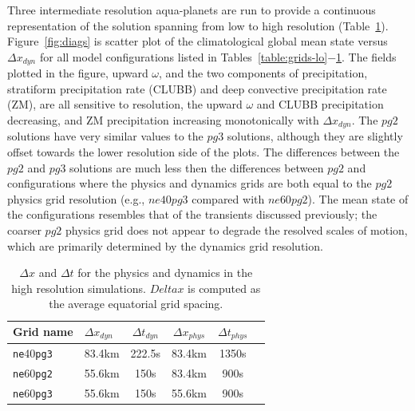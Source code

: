 \documentclass{agujournal}
\begin{document}
Three intermediate resolution aqua-planets are run to provide a continuous representation of the solution spanning from low to high resolution (Table~\ref{table:grids-med}). Figure~\ref{fig:diags} is scatter plot of the climatological global mean state versus $\Delta x_{dyn}$ for all model configurations listed in Tables~\ref{table:grids-lo}$-$\ref{table:grids-med}. The fields plotted in the figure, upward $\omega$, and the two components of precipitation, stratiform precipitation rate (CLUBB) and deep convective precipitation rate (ZM), are all sensitive to resolution, the upward $\omega$ and CLUBB precipitation decreasing, and ZM precipitation increasing monotonically with $\Delta x_{dyn}$. The $pg2$ solutions have very similar values to the $pg3$ solutions, although they are slightly offset towards the lower resolution side of the plots. The differences between the $pg2$ and $pg3$ solutions are much less then the differences between $pg2$ and configurations where the physics and dynamics grids are both equal to the $pg2$ physics grid resolution (e.g., $ne40pg3$ compared with $ne60pg2$). The mean state of the configurations resembles that of the transients discussed previously; the coarser $pg2$ physics grid does not appear to degrade the resolved scales of motion, which are primarily determined by the dynamics grid resolution.

 \begin{table}
 \caption{$\Delta x$ and $\Delta t$ for the physics and dynamics in the high resolution simulations. $Delta x$ is computed as the average equatorial grid spacing.}
 \centering
 \begin{tabular}{llcccc}
 \hline
 Grid name & $\Delta x_{dyn}$  & $\Delta t_{dyn}$ & $\Delta x_{phys}$  & $\Delta t_{phys}$ \\
 \hline
   {\tt{ne}}40{\tt{pg3}}  & 83.4km & 222.5s  & 83.4km & 1350s \\
   {\tt{ne}}60{\tt{pg2}}  & 55.6km & 150s  & 83.4km & 900s \\
   {\tt{ne}}60{\tt{pg3}}  & 55.6km & 150s  & 55.6km & 900s \\
 \hline
 \end{tabular}
 \label{table:grids-med}
 \end{table}
\end{document}
